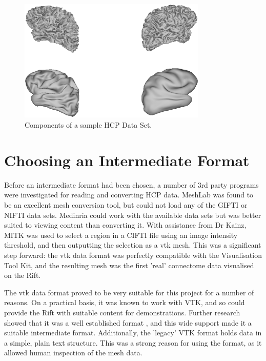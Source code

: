 \documentclass[MSc,paper=a4,pagesize=auto]{icldt}
\begin{document}
\begin{figure}[htbp!]
    \centering
    \includegraphics[width=0.8\textwidth]{resources/connectome_gifti}
    \caption{Components of a sample HCP Data Set.}
    \label{fig:connectome_gifti}
\end{figure}

\section{Choosing an Intermediate Format}
\label{sec:choosing_an_intermediate_format}
Before an intermediate format had been chosen, a number of 3rd party programs were investigated for reading and converting HCP data. MeshLab \cite{MeshLab2014} was found to be an excellent mesh conversion tool, but could not load any of the GIFTI or NIFTI data sets. Medinria \cite{MedInria2014} could work with the available data sets but was better suited to viewing content than converting it. With assistance from Dr Kainz, MITK \cite{MITK2014} was used to select a region in a CIFTI file using an image intensity threshold, and then outputting the selection as a vtk mesh. This was a significant step forward: the vtk data format was perfectly compatible with the Visualisation Tool Kit, and the resulting mesh was the first 'real' connectome data visualised on the Rift.

The vtk data format proved to be very suitable for this project for a number of reasons. On a practical basis, it was known to work with VTK, and so could provide the Rift with suitable content for demonstrations. Further research showed that it was a well established format \cite{VTK_file_formats}, and this wide support made it a suitable intermediate format. Additionally, the 'legacy' VTK format holds data in a simple, plain text structure. This was a strong reason for using the format, as it allowed human inspection of the mesh data. 
\end{document}
